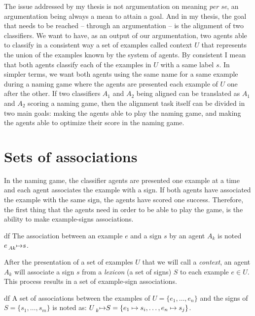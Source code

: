 The issue addressed by my thesis is not argumentation on meaning \emph{per se}, an argumentation being always a mean to attain a goal. And in my thesis, the goal that needs to be reached -- through an argumentation -- is the alignment of two classifiers. We want to have, as an output of our argumentation, two agents able to classify in a consistent way a set of examples called context $U$ that represents the union of the examples known by the system of agents. By consistent I mean that both agents classify each of the examples in $U$ with a same label $s$. In simpler terms, we want both agents using the same name for a same example during a naming game where the agents are presented each example of $U$ one after the other.
If two classifiers $A_{1}$ and $A_2$ being aligned can be translated as $A_{1}$ and $A_{2}$ scoring a naming game, then the alignment task itself can be divided in two main goals: making the agents able to play the naming game, and making the agents able to optimize their score in the naming game.

\section{Sets of associations}
In the naming game, the classifier agents are presented one example at a time and each agent associates the example with a sign. If both agents have associated the example with the same sign, the agents have scored one success. Therefore, the first thing that the agents need in order to be able to play the game, is the ability to make example-signs associations.

\begin{restatable}{df}
The association between an example $e$ and a sign $s$ by an agent $A_{k}$ is noted $e \prescript{}{Ak}{\mapsto} s$.
\end{restatable}

After the presentation of a set of examples $U$ that we will call a \emph{context}, an agent $A_{k}$ will associate a sign $s$ from a \emph{lexicon} (a set of signs) $S$ to each example $e \in U$. This process results in a set of example-sign associations.

\begin{restatable}{df}
A set of associations between the examples of $U = \{e_{1}, \ldots, e_{n}\}$ and the signs of $S = \{s_{1}, \ldots, s_{m}\}$ is noted as: $U \prescript{}{k}{\mapsto} S = \{ e_{1} \mapsto s_{i}, \ldots, e_{n} \mapsto s_{j}\}$.
\end{restatable}


